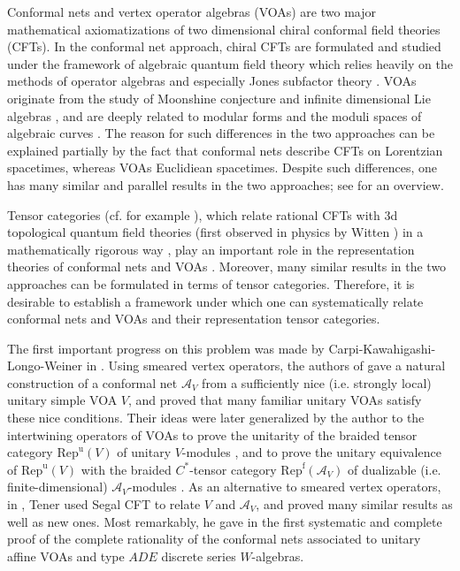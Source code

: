 \documentclass[12pt,a4paper]{article}
\theoremstyle{definition}
\theoremstyle{plain}
\newcommand{\mc}{\mathcal}
\newcommand{\Repf}{\mathrm{Rep}^{\mathrm f}}
\newcommand{\RepuV}{\mathrm{Rep}^{\mathrm u}(V)}
\numberwithin{equation}{subsection}
\begin{document}
Conformal nets and vertex operator algebras (VOAs) are two major mathematical axiomatizations of two dimensional chiral conformal field theories (CFTs). In the conformal net approach, chiral CFTs are formulated and studied under the framework of algebraic quantum field theory \cite{HK64,Haag96} which relies heavily on the methods of operator algebras and especially  Jones subfactor theory \cite{Jon83,Lon89,Lon90}. VOAs originate from the study of Moonshine conjecture and infinite dimensional Lie algebras \cite{FLM89,Bor92}, and are deeply related to modular forms \cite{Zhu96} and the moduli spaces of algebraic curves \cite{TUY89,FB04,DGT19a,DGT19b}. The reason for such  differences in the two approaches can be explained partially by the fact that conformal nets describe CFTs on Lorentzian spacetimes, whereas VOAs Euclidiean spacetimes. Despite such differences, one has many similar and parallel results in the two approaches; see  \cite{Kaw15,Kaw18} for an overview.



Tensor categories (cf. for example \cite{BK01,EGNO15}), which relate rational CFTs with 3d topological quantum field theories (first observed in physics by Witten \cite{Wit89}) in a mathematically rigorous way \cite{Tur94}, play an important role in the representation theories of conformal nets \cite{FRS89,FRS92,KLM01} and VOAs \cite{Hua05a,NT05,Hua08b}. Moreover, many similar results in the two approaches can be formulated in terms of tensor categories. Therefore, it is desirable to establish a framework under which one can systematically relate conformal nets and VOAs and their representation tensor categories.

The first important progress on this problem  was made by Carpi-Kawahigashi-Longo-Weiner in \cite{CKLW18}. Using smeared vertex operators, the authors of \cite{CKLW18} gave a natural construction of a conformal net $\mc A_V$ from a sufficiently nice (i.e. strongly local) unitary simple VOA $V$, and proved that many familiar unitary VOAs satisfy these nice conditions. Their ideas were later generalized by the author to the intertwining operators of VOAs to prove the unitarity of the braided tensor category $\RepuV$ of unitary $V$-modules \cite{Gui19a,Gui19b,Gui19c}, and to prove the unitary equivalence of $\RepuV$ with the braided $C^*$-tensor category $\Repf(\mc A_V)$ of dualizable (i.e. finite-dimensional) $\mc A_V$-modules \cite{Gui21a}. As an alternative to smeared vertex operators, in \cite{Ten19a,Ten19b,Ten19c}, Tener used Segal CFT \cite{Seg04,Ten17}  to relate $V$ and $\mc A_V$, and proved many similar results as well as new ones. Most remarkably, he gave in \cite{Ten19c}  the first systematic and complete proof of the complete rationality of the conformal nets associated to unitary affine VOAs and type $ADE$ discrete series $W$-algebras.
\end{document}
